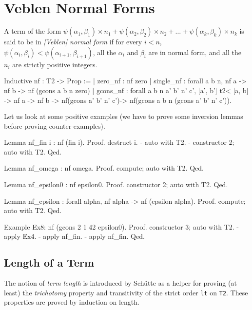 {\section{Veblen Normal Forms}
\begin{definition}
  A term of the form $\psi(\alpha_1,\beta_1)\times n_1+ \psi(\alpha_2,\beta_2)\times n_2+\dots+\psi(\alpha_k,\beta_k)\times n_k$ is said to be in
 \emph{[Veblen] normal form} if for every $i<n$, $\psi(\alpha_i,\beta_i)<\psi(\alpha_{i+1},\beta_{i+1})$, all the $\alpha_i$ and $\beta_i$ are in normal form, and all the $n_i$ are strictly positive integers.
\end{definition}

\begin{Coqsrc}
Inductive nf : T2 -> Prop :=
| zero_nf : nf zero
| single_nf : forall a b n, nf a ->  nf b -> nf (gcons a b n zero)
| gcons_nf : forall a b n a' b' n' c', 
                      [a', b'] t2< [a, b]  -> 
                      nf a -> nf b -> 
                      nf(gcons a' b' n' c')-> 
                      nf(gcons a b n (gcons a' b' n' c')).
\end{Coqsrc}

Let us look at some positive examples (we have to prove some inversion lemmas before proving counter-examples).


\begin{Coqsrc}
Lemma  nf_fin i : nf (fin i).
Proof.
  destruct i.
  - auto with T2.
  - constructor 2; auto with T2.
Qed.

Lemma nf_omega : nf omega.
Proof.  compute; auto with T2. Qed.

Lemma nf_epsilon0 : nf epsilon0.
Proof. constructor 2; auto with T2. Qed.

Lemma nf_epsilon : forall alpha, nf alpha -> nf (epsilon alpha).
Proof. compute; auto with T2. Qed.

Example Ex8: nf (gcons 2 1 42 epsilon0).
Proof.
  constructor 3; auto with T2.
  - apply Ex4.
  - apply nf_fin.
  - apply nf_fin.
Qed.
\end{Coqsrc}


\subsection{Length of a Term}

The notion of \emph{term length} is introduced by Schütte as a helper for proving (at least) the \emph{trichotomy} property and transitivity of the strict order \texttt{lt} on \texttt{T2}. These properties are proved by induction on length.

}
